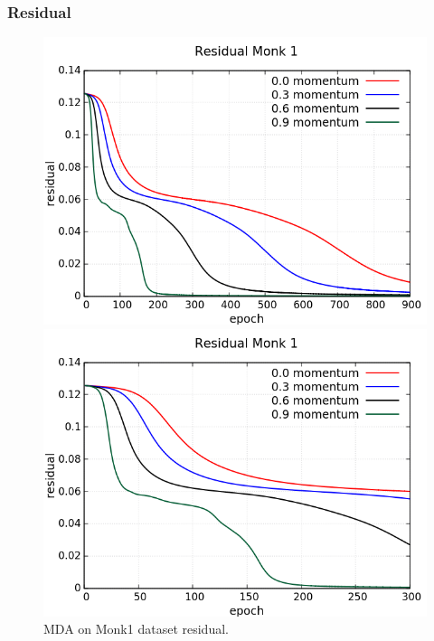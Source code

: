 \subsubsection{Residual}
\begin{figure}[H]
	\centering
	\begin{minipage}[t]{0.5\linewidth}
		\includegraphics[width=\linewidth]{data/MGD/Monk1/M/Monk1_MGD_Residual_standard.png}
	\end{minipage}%
	\begin{minipage}[t]{0.5\linewidth}
		\includegraphics[width=\linewidth]{data/MGD/Monk1/M/Monk1_MGD_Residual_zoom.png}
	\end{minipage}
	\caption{MDA on Monk1 dataset residual.}
\end{figure}
